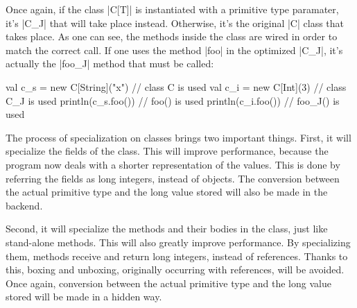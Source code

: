 Once again, if the class |C[T]| is instantiated with a primitive type paramater, it's |C_J| that will take place instead. Otherwise, it's the original |C| class that takes place. As one can see, the methods inside the class are wired in order to match the correct call. If one uses the method |foo| in the optimized |C_J|, it's actually the |foo_J| method that must be called:

\begin{lstlisting-nobreak}
val c_s = new C[String]("x")  // class C is used
val c_i = new C[Int](3)               // class C_J is used
println(c_s.foo())   // foo() is used
println(c_i.foo())   // foo_J() is used
\end{lstlisting-nobreak}

The process of specialization on classes brings two important things. First, it will specialize the fields of the class. This will improve performance, because the program now deals with a shorter representation of the values. This is done by referring the fields as long integers, instead of objects. The conversion between the actual primitive type and the long value stored will also be made in the backend.

Second, it will specialize the methods and their bodies in the class, just like stand-alone methods. This will also greatly improve performance. By specializing them, methods receive and return long integers, instead of references. Thanks to this, boxing and unboxing, originally occurring with references, will be avoided. Once again, conversion between the actual primitive type and the long value stored will be made in a hidden way.